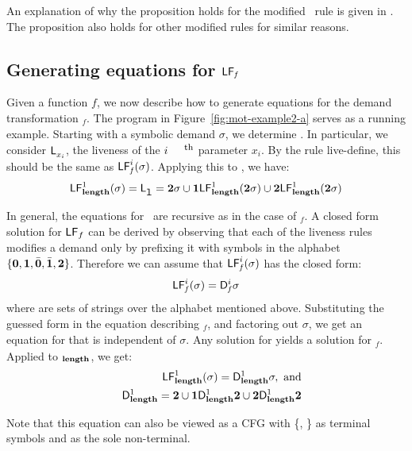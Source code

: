 \documentclass[preprint, 9pt]{sigplanconf}
\begin{document}
An  explanation of  why the  proposition holds  for the
modified  \CONS\ rule  is  given in  \cite{asati14lgc}.
The proposition also holds for other modified rules for
similar reasons.


\subsection{Generating equations for $\mathsf{LF}_{\mathit f}$}
Given a  function $\mathit{f}$, we now  describe how to
generate  equations   for  the   demand  transformation
\Lfonly$_\mathit{f}$.        The       program       in
Figure~\ref{fig:mot-example2-a}   serves  as   a  running
example.  Starting with a  symbolic demand $\sigma$, we
determine  .   In
particular, we  consider $\mathsf{L}_{{x_i}}^{}$,  the liveness
of the $i^{\mbox{\footnotesize th}}$ parameter $x_i$.   By   the   rule   {\sc
  live-define},   this   should    be   the   same   as
$\mathsf{LF}_{\mathit f}^{i}( {\mathit \sigma})$. Applying this to \length, we have:
$$
 \mathsf{LF}_{\mathit {\mathbf{length}}}^{1}( {\mathit \sigma}) = \mathsf{L}_{{\mbox{\tt l}}}^{} = {\mathbf{2}}\sigma \cup \mathbf{1}\mathsf{LF}_{\mathit {\mathbf{length}}}^{1}( {\mathit {{\mathbf{2}}}\sigma})
  \cup {\mathbf{2}}\mathsf{LF}_{\mathit {\mathbf{length}}}^{1}( {\mathit {{\mathbf{2}}}\sigma})
$$

In general, the equations for \Lfonly\ are recursive as in the case of
\Lfonly$_\mathit{f}$. A closed  form solution for $\mathsf{LF}_{\mathit \mathit{f}}$
can be derived by observing that each of the liveness rules modifies a
demand  only by  prefixing it  with symbols  in the  alphabet $\lbrace
\mathbf{0}, \mathbf{1},\bar{\mathbf{0}},  \bar{\mathbf{1}}, {\mathbf{2}}  \rbrace$. Therefore we  can assume
that $\mathsf{LF}_{\mathit f}^{i}( {\mathit \sigma})$ has the closed form:
\begin{eqnarray}
\label{eq:LF:DI}
  \mathsf{LF}_{\mathit f}^{i}( {\mathit \sigma}) = \mathsf{D}_{\mathit f}^{i}\sigma
\end{eqnarray}
where   are sets of strings  over the alphabet
mentioned above.  Substituting the  guessed form in the
equation   describing    \Lfonly$_{\mathit   f}$,   and
factoring  out   $\sigma$,  we  get  an   equation  for
  that   is  independent  of   $\sigma$.   Any
solution   for      yields  a   solution   for
\Lfonly$_{\mathit  f}$.   Applied to  \Lfonly$_{\mathit
  {\mathbf{length}}}$, we get:
  \begin{eqnarray*}
&&  \mathsf{LF}_{\mathit {\mathbf{length}} }^{1}( {\mathit \sigma}) = \mathsf{D}_{\mathit {\mathbf{length}}}^{1}\sigma,~\mbox{and}\\
&&   \mathsf{D}_{\mathit {\mathbf{length}}}^{1} = {\mathbf{2}} \cup \mathbf{1}\mathsf{D}_{\mathit {\mathbf{length}}}^{1}{\mathbf{2}}
       \cup {\mathbf{2}}\mathsf{D}_{\mathit {\mathbf{length}}}^{1}{{\mathbf{2}}}
  \end{eqnarray*}

Note that this equation can also be viewed as a CFG with \{\acdr,
\clazy\} as terminal symbols and  as the sole
non-terminal.
\end{document}
